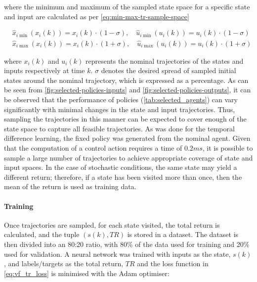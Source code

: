 where the minimum and maximum of the sampled state space for a specific state and input are calculated as per \autoref{eq:min-max-tr-sample-space}

\begin{equation}\label{eq:min-max-tr-sample-space}
\begin{aligned}
    &\hat{x}_{i\min} (x_i (k)) = x_{i}(k) \cdot (1-\sigma),\quad \hat{u}_{i\min}(u_i (k)) = u_{i}(k) \cdot (1-\sigma)\\
    &\hat{x}_{i\max} (x_i (k)) = x_{i}(k) \cdot (1+\sigma),\quad \hat{u}_{i\max}(u_i (k))  = u_{i}(k) \cdot (1+\sigma)
\end{aligned}
\end{equation}

where ${x}_{i}(k)$ and ${u}_{i}(k)$ represents the nominal trajectories of the states and inputs respectively at time $k$. $\sigma$ denotes the desired spread of sampled initial states around the nominal trajectory, which is expressed as a percentage. As can be seen from \autoref{fig:selected-policies-inputs} and \autoref{fig:selected-policies-outputs}, it can be observed that the performance of policies (\autoref{tab:selected_agents}) can vary significantly with minimal changes in the state and input trajectories. Thus, sampling the trajectories in this manner can be expected to cover enough of the state space to capture all feasible trajectories. As was done for the temporal difference learning, the fixed policy was generated from the nominal agent. Given that the computation of a control action requires a time of $0.2 ms$, it is possible to sample a large number of trajectories to achieve appropriate coverage of state and input spaces. In the case of stochastic conditions, the same state may yield a different return; therefore, if a state has been visited more than once, then the mean of the return is used as training data.

\paragraph{Training}
Once trajectories are sampled, for each state visited, the total return is calculated, and the tuple $(s(k),TR)$ is stored in a dataset. The dataset is then divided into an 80:20 ratio, with 80\% of the data used for training and 20\% used for validation. A neural network was trained with inputs as the state, $s(k)$, and labels/targets as the total return, $TR$ and the loss function in \autoref{eq:vf_tr_loss} is minimised with the Adam optimiser:

